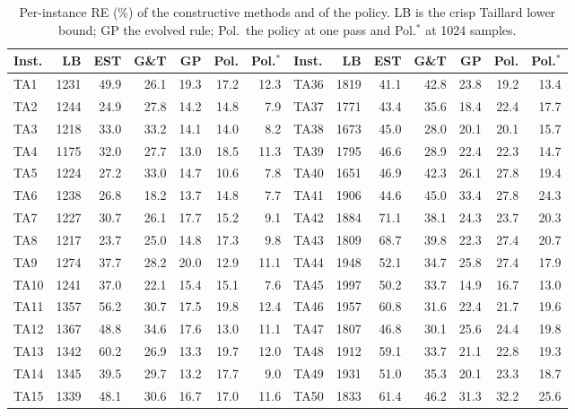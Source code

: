 \documentclass[preprint,authoryear,12pt]{elsarticle}
\begin{document}
\begin{table}[h]
\centering\scriptsize
\caption{Per-instance RE (\%) of the constructive methods and of the
policy. LB is the crisp Taillard lower bound; GP the evolved rule;
Pol.\ the policy at one pass and Pol.$^{\ast}$ at 1024 samples.}
\label{sup:tab-perinstance}
\renewcommand{\arraystretch}{0.92}
\setlength{\tabcolsep}{3pt}
\begin{tabular}{lrrrrrr@{\hskip 0.7em}|@{\hskip 0.7em}lrrrrrr}
\toprule
Inst. & LB & EST & G\&T & GP & Pol. & Pol.$^{\ast}$ &
Inst. & LB & EST & G\&T & GP & Pol. & Pol.$^{\ast}$ \\
\midrule
TA1 & 1231 & 49.9 & 26.1 & 19.3 & 17.2 & 12.3 & TA36 & 1819 & 41.1 & 42.8 & 23.8 & 19.2 & 13.4 \\
TA2 & 1244 & 24.9 & 27.8 & 14.2 & 14.8 & 7.9 & TA37 & 1771 & 43.4 & 35.6 & 18.4 & 22.4 & 17.7 \\
TA3 & 1218 & 33.0 & 33.2 & 14.1 & 14.0 & 8.2 & TA38 & 1673 & 45.0 & 28.0 & 20.1 & 20.1 & 15.7 \\
TA4 & 1175 & 32.0 & 27.7 & 13.0 & 18.5 & 11.3 & TA39 & 1795 & 46.6 & 28.9 & 22.4 & 22.3 & 14.7 \\
TA5 & 1224 & 27.2 & 33.0 & 14.7 & 10.6 & 7.8 & TA40 & 1651 & 46.9 & 42.3 & 26.1 & 27.8 & 19.4 \\
TA6 & 1238 & 26.8 & 18.2 & 13.7 & 14.8 & 7.7 & TA41 & 1906 & 44.6 & 45.0 & 33.4 & 27.8 & 24.3 \\
TA7 & 1227 & 30.7 & 26.1 & 17.7 & 15.2 & 9.1 & TA42 & 1884 & 71.1 & 38.1 & 24.3 & 23.7 & 20.3 \\
TA8 & 1217 & 23.7 & 25.0 & 14.8 & 17.3 & 9.8 & TA43 & 1809 & 68.7 & 39.8 & 22.3 & 27.4 & 20.7 \\
TA9 & 1274 & 37.7 & 28.2 & 20.0 & 12.9 & 11.1 & TA44 & 1948 & 52.1 & 34.7 & 25.8 & 27.4 & 17.9 \\
TA10 & 1241 & 37.0 & 22.1 & 15.4 & 15.1 & 7.6 & TA45 & 1997 & 50.2 & 33.7 & 14.9 & 16.7 & 13.0 \\
TA11 & 1357 & 56.2 & 30.7 & 17.5 & 19.8 & 12.4 & TA46 & 1957 & 60.8 & 31.6 & 22.4 & 21.7 & 19.6 \\
TA12 & 1367 & 48.8 & 34.6 & 17.6 & 13.0 & 11.1 & TA47 & 1807 & 46.8 & 30.1 & 25.6 & 24.4 & 19.8 \\
TA13 & 1342 & 60.2 & 26.9 & 13.3 & 19.7 & 12.0 & TA48 & 1912 & 59.1 & 33.7 & 21.1 & 22.8 & 19.3 \\
TA14 & 1345 & 39.5 & 29.7 & 13.2 & 17.7 & 9.0 & TA49 & 1931 & 51.0 & 35.3 & 20.1 & 23.3 & 18.7 \\
TA15 & 1339 & 48.1 & 30.6 & 16.7 & 17.0 & 11.6 & TA50 & 1833 & 61.4 & 46.2 & 31.3 & 32.2 & 25.6 \\

\end{tabular}
\end{table}
\end{document}
